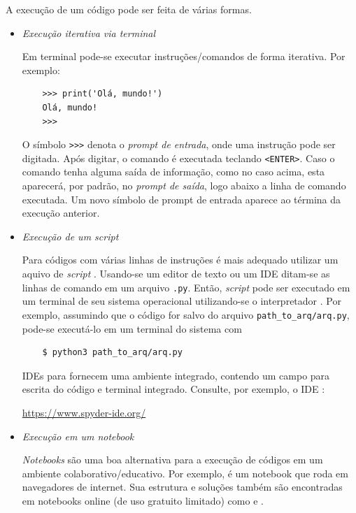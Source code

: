 A execução de um código {\python} pode ser feita de várias formas.

\begin{itemize}
\item \emph{Execução iterativa via terminal}

  Em terminal {\python} pode-se executar instruções/comandos de forma iterativa. Por exemplo:
  \begin{lstlisting}
    >>> print('Olá, mundo!')
    Olá, mundo!
    >>> 
  \end{lstlisting}

  O símbolo \lstinline+>>>+ denota o \emph{prompt de entrada}, onde uma instrução {\python} pode ser digitada. Após digitar, o comando é executada teclando \lstinline+<ENTER>+. Caso o comando tenha alguma saída de informação, como no caso acima, esta aparecerá, por padrão, no \emph{prompt de saída}, logo abaixo a linha de comando executada. Um novo símbolo de prompt de entrada aparece ao términa da execução anterior.

\item \emph{Execução de um {\it script}}

  Para códigos com várias linhas de instruções é mais adequado utilizar um aquivo de {\it script} {\python}. Usando-se um editor de texto ou um IDE ditam-se as linhas de comando em um arquivo \lstinline+.py+. Então, {\it script} pode ser executado em um terminal de seu sistema operacional utilizando-se o interpretador {\python}. Por exemplo, assumindo que o código for salvo do arquivo \lstinline+path_to_arq/arq.py+, pode-se executá-lo em um terminal do sistema com
  \begin{lstlisting}
    $ python3 path_to_arq/arq.py 
  \end{lstlisting}%
  

  IDEs para {\python} fornecem uma ambiente integrado, contendo um campo para escrita do código e terminal {\python} integrado. Consulte, por exemplo, o IDE {\spyder}:
  \begin{center}
    \url{https://www.spyder-ide.org/}
  \end{center}

\item \emph{Execução em um {\it notebook}}

  {\it Notebooks} {\python} são uma boa alternativa para a execução de códigos em um ambiente colaborativo/educativo. Por exemplo, {\jupyter} é um notebook que roda em navegadores de internet. Sua estrutura e soluções também são encontradas em notebooks online (de uso gratuito limitado) como {\colab} e {\kaggle}.  
\end{itemize}

